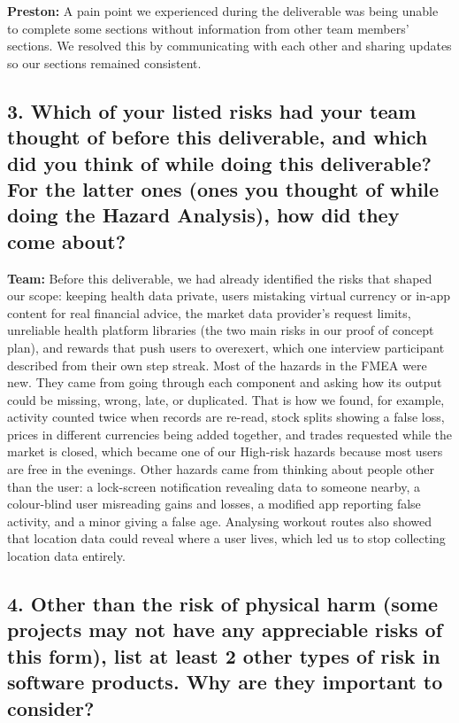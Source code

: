 \documentclass{article}
\begin{document}
\bigskip
\noindent
\textbf{Preston:} A pain point we experienced during the deliverable was being unable to complete some sections without information from other team members’ sections. We resolved this by communicating with each other and sharing updates so our sections remained consistent.

\subsection*{3. Which of your listed risks had your team thought of before this
    deliverable, and which did you think of while doing this deliverable? For
    the latter ones (ones you thought of while doing the Hazard Analysis), how
    did they come about?}


\textbf{Team:} Before this deliverable, we had already identified the
    risks that shaped our scope: keeping health data private, users mistaking
    virtual currency or in-app content for real financial advice, the market
    data provider's request limits, unreliable health platform libraries
    (the two main risks in our proof of concept plan), and rewards that push
    users to overexert, which one interview participant described from their
    own step streak. Most of the hazards in the FMEA were new. They came from
    going through each component and asking how its output could be missing,
    wrong, late, or duplicated. That is how we found, for example, activity
    counted twice when records are re-read, stock splits showing a false
    loss, prices in different currencies being added together, and trades
    requested while the market is closed, which became one of our High-risk
    hazards because most users are free in the evenings. Other hazards came
    from thinking about people other than the user: a lock-screen
    notification revealing data to someone nearby, a colour-blind user
    misreading gains and losses, a modified app reporting false activity, and
    a minor giving a false age. Analysing workout routes also showed that
    location data could reveal where a user lives, which led us to stop
    collecting location data entirely.

\subsection*{4. Other than the risk of physical harm (some projects may not have any
    appreciable risks of this form), list at least 2 other types of risk in
    software products. Why are they important to consider?}
\end{document}
